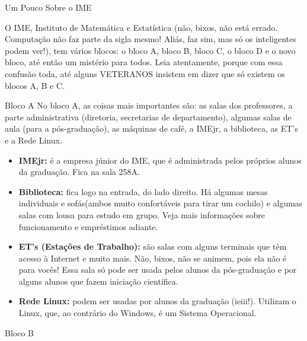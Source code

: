\begin{secao}{Um Pouco Sobre o IME}

O IME, Instituto de Matemática e Estatística (não, bixos, não está errado.
Computação não faz parte da sigla mesmo! Aliás, faz sim, mas só os inteligentes
podem ver!), tem vários blocos: o bloco A, bloco B, bloco C, o bloco D e o
novo bloco, até então um mistério para todos. Leia atentamente, porque com essa
confusão toda, até alguns VETERANOS insistem em dizer que só existem os blocos
A, B e C.


\begin{subsecao}{Bloco A}
No bloco A, as coisas mais importantes são: as salas dos professores, a parte
administrativa (diretoria, secretarias de departamento), algumas salas de aula
(para a pós-graduação), as máquinas de café, a IMEjr, a biblioteca, as ET's e
a Rede Linux.

\begin{itemize}

\item {\bf IMEjr:} é a empresa júnior do IME, que é administrada pelos próprios
alunos da graduação. Fica na sala 258A.

\item {\bf Biblioteca:} fica logo na entrada, do lado direito. Há algumas mesas
individuais e sofás(ambos muito confortáveis para tirar um cochilo) e algumas salas
com lousa para estudo em grupo. Veja mais informações sobre funcionamento e
empréstimos adiante.

\item {\bf ET's (Estações de Trabalho):} são salas com alguns terminais que têm
acesso à Internet e muito mais. Não, bixos, não se animem, pois ela não é para
vocês! Essa sala só pode ser usada pelos alunos da pós-graduação e por alguns
alunos que fazem iniciação científica.

\item {\bf Rede Linux:} podem ser usadas por alunos da graduação (ieiii!).
Utilizam o Linux, que, ao contrário do Windows, é um Sistema Operacional.

\end{itemize}




\end{subsecao}

\begin{subsecao}{Bloco B}



\end{subsecao}
\end{secao}
